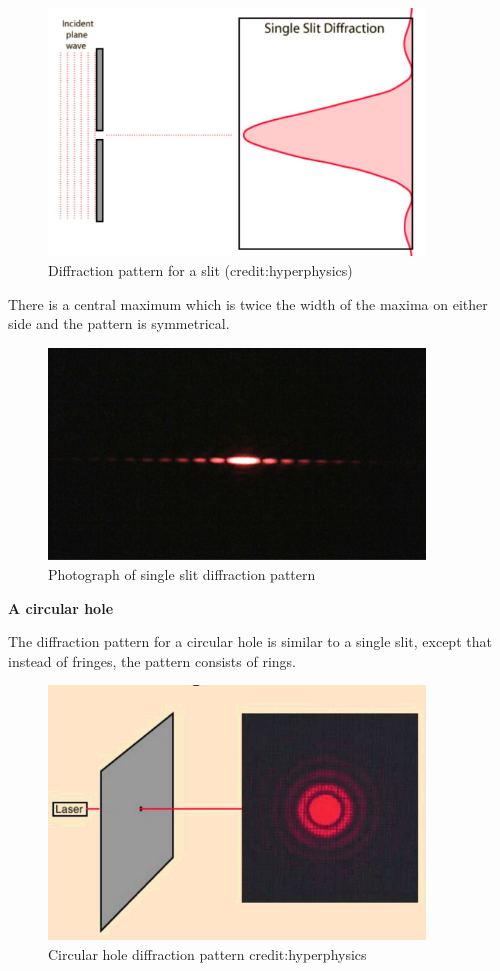 \documentclass[revision-guide.tex]{subfiles}
\begin{document}
\begin{figure}[h!]
\centering
\includegraphics[width=10cm]{figs/chapt-7/slit.JPG}
\caption{Diffraction pattern for a slit (credit:hyperphysics)}
\end{figure}

There is a central maximum which is twice the width of the maxima on either side and the pattern is symmetrical.

\begin{figure}[h!]
\centering
\includegraphics[width=10cm]{figs/chapt-7/slitphoto.jpg}
\caption{Photograph of single slit diffraction pattern}
\end{figure}

\textbf{A circular hole}

The diffraction pattern for a circular hole is similar to a single slit, except that instead of fringes, the pattern consists of rings.

\begin{figure}[h!]
\centering
\includegraphics[width=10cm]{figs/chapt-7/hole.JPG}
\caption{Circular hole diffraction pattern {credit:hyperphysics}}
\end{figure}
\end{document}
